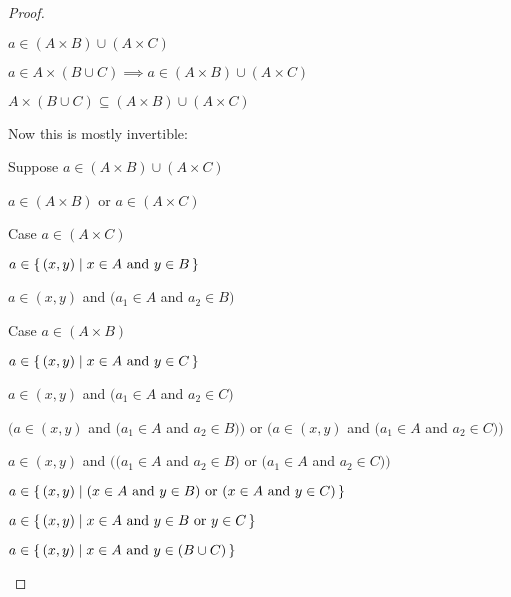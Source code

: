 \documentclass[../../main.tex]{subfiles}
\begin{document}
\begin{enumerate}
\begin{proof}
\begin{lxl}
\begin{lxl}
                    \item $a \in (A \times B) \cup (A \times C)$
                \end{lxl}
                \item $a \in A \times (B \cup C) \implies a \in (A \times B) \cup (A \times C)$
                \item $A \times (B \cup C) \subseteq (A \times B) \cup (A \times C)$
            \end{lxl}
            \item Now this is mostly invertible:
            \begin{lxl}[resume]
                \item Suppose $a \in (A \times B) \cup (A \times C)$
                \begin{lxl}
                    \item $a \in (A \times B)$ or $a \in (A \times C)$
                    \item Case $a \in (A \times C)$
                    \begin{lxl}
                        \item $a \in \Set{(x,y)}{x \in A$ and $y \in B}$
                        \item $a \in (x,y)$ and $(a_1 \in A$ and $a_2 \in B)$
                    \end{lxl}
                    \item Case $a \in (A \times B)$
                    \begin{lxl}
                        \item $a \in \Set{(x,y)}{x \in A$ and $y \in C}$
                        \item $a \in (x,y)$ and $(a_1 \in A$ and $a_2 \in C)$
                    \end{lxl}
                    \item $\bigl( a \in (x,y)$ and $(a_1 \in A$ and $a_2 \in B) \bigr)$ or $\bigl( a \in (x,y)$ and $(a_1 \in A$ and $a_2 \in C) \bigr)$
                    \item $a \in (x,y)$ and $\bigl( (a_1 \in A$ and $a_2 \in B)$ or $(a_1 \in A$ and $a_2 \in C) \bigr)$
                    \item $a \in \Set{(x,y)}{(x \in A$ and $y \in B)$ or $(x \in A$ and $y \in C)}$
                    \item $a \in \Set{(x,y)}{x \in A$ and $y \in B$ or $y \in C}$
                    \item $a \in \Set{(x,y)}{x \in A$ and $y \in (B \cup C)}$

\end{lxl}
\end{lxl}
\end{proof}
\end{enumerate}
\end{document}
